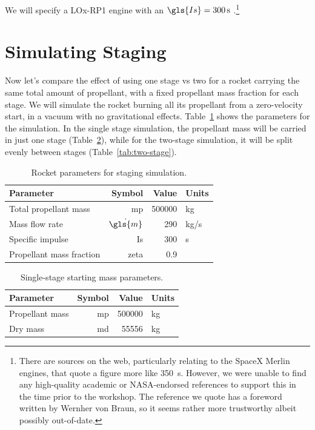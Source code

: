 \documentclass[12pt,openany]{book}
\begin{document}
We will specify a LOx-RP1 engine with an \(\gls{Is} = \SI{300}{\s}\) \cite{huzel1967}.\footnote{There are sources on the web, particularly relating to the SpaceX Merlin engines, that quote a figure more like \SI{350}{\s}. However, we were unable to find any high-quality academic or NASA-endorsed references to support this in the time prior to the workshop. The reference we quote has a foreword written by Wernher von Braun, so it seems rather more trustworthy albeit possibly out-of-date.}

\section{Simulating Staging}

Now let's compare the effect of using one stage vs two for a rocket carrying the same total amount of propellant, with a fixed propellant mass fraction for each stage. We will simulate the rocket burning all its propellant from a zero-velocity start, in a vacuum with no gravitational effects. Table~\ref{tab:staging-param} shows the parameters for the simulation. In the single stage simulation, the propellant mass will be carried in just one stage (Table~\ref{tab:single-stage}), while for the two-stage simulation, it will be split evenly between stages (Table~\ref{tab:two-stage}).

\begin{table}
  \centering
  \begin{tabular}[htbp]{ l r r l }
    \toprule
    Parameter                & Symbol            & Value        & Units     \\ \midrule
    Total propellant mass    & \gls{mp}          & \num{500000} & \si{kg}   \\
    Mass flow rate           & \(\dot{\gls{m}}\) & \num{290}    & \si{kg/s} \\
    Specific impulse         & \gls{Is}          & \num{300}    & \si{s}    \\
    Propellant mass fraction & \gls{zeta}        & \num{0.9}    &           \\
    \bottomrule
  \end{tabular}
  \caption{Rocket parameters for staging simulation.}
  \label{tab:staging-param}
\end{table}

\begin{table}
  \centering
  \begin{tabular}[htbp]{ l r r l }
    \toprule
    Parameter       & Symbol   & Value        & Units     \\ \midrule
    Propellant mass & \gls{mp} & \num{500000} & \si{kg}   \\
    Dry mass        & \gls{md} & \num{55556}  & \si{kg}   \\
    \bottomrule
  \end{tabular}
  \caption{Single-stage starting mass parameters.}
  \label{tab:single-stage}
\end{table}
\end{document}
